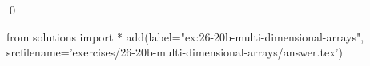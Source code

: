 
\begin{ex} 
  \label{ex:26-20b-multi-dimensional-arrays}
  
  \qed
\end{ex} 
\begin{python0}
from solutions import *
add(label="ex:26-20b-multi-dimensional-arrays",
    srcfilename='exercises/26-20b-multi-dimensional-arrays/answer.tex') 
\end{python0}
